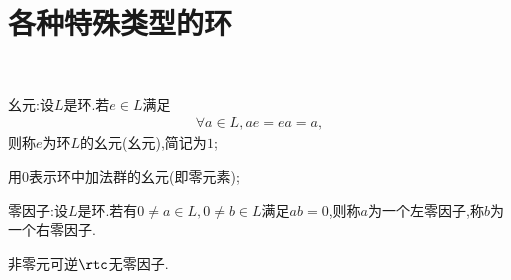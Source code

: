 \section{各种特殊类型的环}
\begin{proposition}\label{auhisgnjdvk}\ 
    \begin{center}
    \end{center}
\end{proposition}
\begin{remark}
    幺元:设$L$是环.若$e\in L$满足\begin{align*}
        \forall a\in L,ae=ea=a,
    \end{align*}则称$e$为环$L$的幺元(幺元),简记为$1$;

    用$0$表示环中加法群的幺元(即零元素);

    零因子:设$L$是环.若有$0\neq a\in L,0\neq b\in L$满足$ab=0$,则称$a$为一个左零因子,称$b$为一个右零因子.
\end{remark}
\begin{lemma}\label{zncxkjvna}
    非零元可逆$\rtc$无零因子.
\end{lemma}
